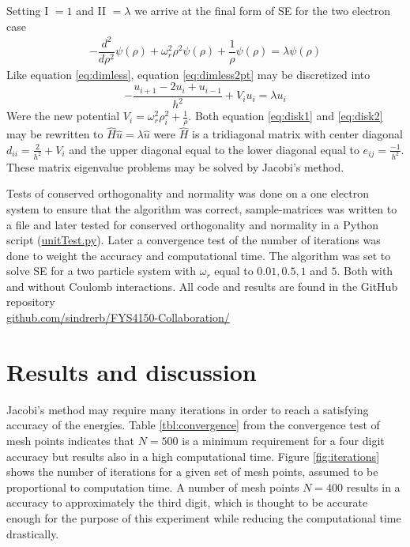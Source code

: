 \documentclass[twoside,twocolumn]{article}
\newcommand{\nl}{
	
	\medskip
	\noindent
}
\newcommand{\CI}{Coulomb interactions}
\begin{document}
	Setting I $= 1$ and II $=\lambda$ we arrive at the final form of SE for the two electron case
	\begin{align}
	-\dfrac{d^2}{d\rho^2} \psi(\rho) + \omega_r^2\rho^2\psi(\rho) +\dfrac{1}{\rho}\psi(\rho) = \lambda \psi(\rho)\label{eq:dimless2pt}
	\end{align}
	Like equation \ref{eq:dimless}, equation \ref{eq:dimless2pt} may be discretized into
	\begin{equation}
	-\frac{u_{i+1}-2u_i+u_{i-1}}{h^2}+V_iu_i = \lambda u_i\label{eq:disk2}
	\end{equation}
	Were the new potential $V_i=\omega_r^2\rho_i^2+\frac{1}{\rho}$. Both equation \ref{eq:disk1} and \ref{eq:disk2} may be rewritten to $\hat{H}\hat{u}=\lambda\hat{u}$ were $\hat{H}$ is a tridiagonal matrix with center diagonal $d_{ii}=\frac{2}{h^2}+V_i$ and the upper diagonal equal to the lower diagonal equal to $e_{ij}=\frac{-1}{h^2}$. These matrix eigenvalue problems may be solved by Jacobi's method.\nl
	
	Tests of conserved orthogonality and normality was done on a one electron system to ensure that the algorithm was correct, sample-matrices was written to a file and later tested for conserved orthogonality and normality in a Python script 
(\href{https://github.com/sindrerb/FYS4150-Collaboration/blob/master/Doc/Project2/unitTest.py}{unitTest.py}). Later a convergence test of the number of iterations was done to weight the accuracy and computational time. The algorithm was set to solve SE for a two particle system with $\omega_r$ equal to $0.01,0.5,1$ and $5$. Both with and without \CI{}.
All code and results are found in the GitHub repository \\
{\small \centering \href{https://github.com/sindrerb/FYS4150-Collaboration/tree/master/Doc/Project2}{github.com/sindrerb/FYS4150-Collaboration/}}
	\section{Results and discussion}
	\label{sec:results}
	Jacobi's method may require many iterations in order to reach a satisfying accuracy of the energies. Table \ref{tbl:convergence} from the convergence test of mesh points indicates that $N=500$ is a minimum requirement for a four digit accuracy but results also in a high computational time. Figure \ref{fig:iterations} shows the number of iterations for a given set of mesh points, assumed to be proportional to computation time.
	A number of mesh points $N=400$ results in a accuracy to approximately the third digit, which is thought to be accurate enough for the purpose of this experiment while  reducing the computational time drastically.\nl
	
\end{document}
